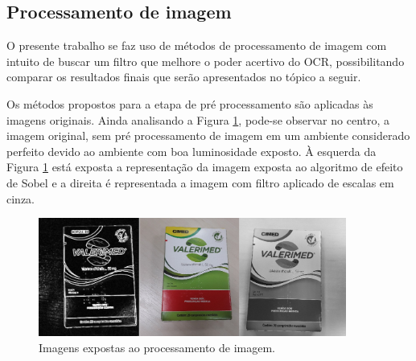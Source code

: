





\subsection{Processamento de imagem}
O presente trabalho se faz uso de métodos de processamento de imagem com intuito de buscar um filtro que melhore o poder acertivo do OCR, possibilitando comparar os resultados finais que serão apresentados no tópico a seguir.

Os métodos propostos para a etapa de pré processamento são aplicadas às imagens originais. Ainda analisando a Figura \ref{tratamentoimg}, pode-se observar no centro, a imagem original, sem pré processamento de imagem em um ambiente considerado perfeito devido ao ambiente com boa luminosidade exposto. À esquerda da Figura \ref{tratamentoimg} está exposta a representação da imagem exposta ao algoritmo de efeito de Sobel e a direita é representada a imagem com filtro aplicado de escalas em cinza.

\begin{figure}[h!]
	\centering
	\includegraphics[width=0.90\textwidth]{Imagens/tratamentoimg.jpg} 
	\caption[Imagens expostas ao processamento de imagem.]{Imagens expostas ao processamento de imagem.}
	\label{tratamentoimg}
\end{figure}